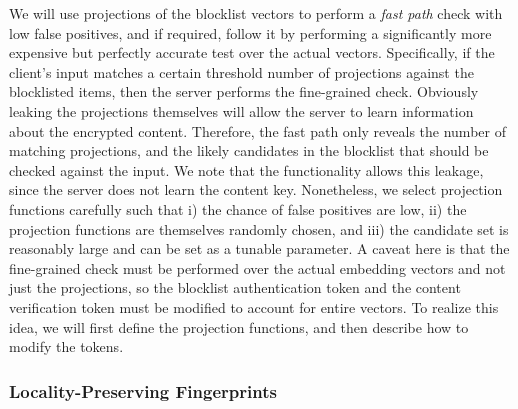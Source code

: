 %
We will use projections of the blocklist vectors to perform a \emph{fast path} check with low false positives, and if required, follow it by performing  a significantly more expensive but perfectly accurate test over the actual vectors. Specifically, if the client's input matches a certain threshold number of projections against the blocklisted items, then the server performs the fine-grained check. Obviously leaking the projections themselves will allow the server to learn information about the encrypted content. Therefore, the fast path only reveals the number of matching projections, and the likely candidates in the blocklist that should be checked against the input. We note that the \contentModFunc functionality allows this leakage, since the server does not learn the content key.  Nonetheless, we select projection functions carefully such that i) the chance of false positives are low, ii) the projection functions are themselves randomly chosen, and iii) the candidate set is reasonably large and can be set as a tunable parameter. A caveat here is that the fine-grained check must be performed over the actual embedding vectors and not just the projections, so the blocklist authentication token and the content verification token must be modified to account for entire vectors. To realize this idea, we will first define the projection functions, and then describe how to modify the tokens. 


\subsubsection{Locality-Preserving Fingerprints}


